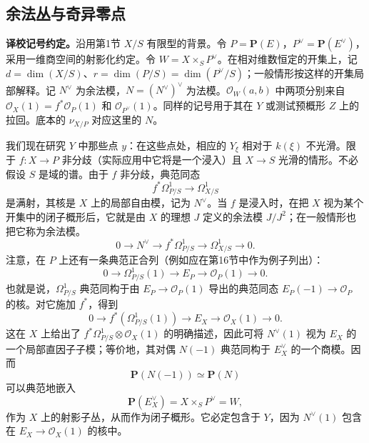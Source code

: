 
\subsection*{余法丛与奇异零点}
\noindent\textbf{译校记号约定。}沿用第1节 $X/S$ 有限型的背景。令 $P=\mathbf P(E)$，$P^\vee=\mathbf P(E^\vee)$，采用一维商空间的射影化约定。令 $W=X\times_S P^\vee$。在相对维数恒定的开集上，记 $d=\dim(X/S)$、$r=\dim(P/S)=\dim(P^\vee/S)$；一般情形按这样的开集局部解释。记 $N^\vee$ 为余法模，$N=(N^\vee)^\vee$ 为法模。$\mathcal O_W(a,b)$ 中两项分别来自 $\mathcal O_X(1)=f^*\mathcal O_P(1)$ 和 $\mathcal O_{P^\vee}(1)$。同样的记号用于其在 $Y$ 或测试预概形 $Z$ 上的拉回。底本的 $\nu_{X/P}$ 对应这里的 $N$。


我们现在研究 $Y$ 中那些点 $y$：在这些点处，相应的 $Y_\xi$ 相对于 $k(\xi)$ 不光滑。限于 $f:X\to P$ 非分歧（实际应用中它将是一个浸入）且 $X\to S$ 光滑的情形。不必假设 $S$ 是域的谱。由于 $f$ 非分歧，典范同态
\[
f^*\Omega^1_{P/S}\longrightarrow\Omega^1_{X/S}
\]
是满射，其核是 $X$ 上的局部自由模，记为 $N^\vee$。当 $f$ 是浸入时，在把 $X$ 视为某个开集中的闭子概形后，它就是由 $X$ 的理想 $J$ 定义的余法模 $J/J^2$；在一般情形也把它称为余法模。
\begin{equation}
0\longrightarrow N^\vee\longrightarrow f^*\Omega^1_{P/S}
\longrightarrow\Omega^1_{X/S}\longrightarrow0.\tag{a}
\end{equation}
注意，在 $P$ 上还有一条典范正合列（例如应在第16节中作为例子列出）：
\begin{equation}
0\longrightarrow\Omega^1_{P/S}(1)\longrightarrow E_P
\longrightarrow\mathcal O_P(1)\longrightarrow0.\tag{b}
\end{equation}
也就是说，$\Omega^1_{P/S}$ 典范同构于由 $E_P\to\mathcal O_P(1)$ 导出的典范同态 $E_P(-1)\to\mathcal O_P$ 的核。对它施加 $f^*$，得到
\begin{equation}
0\longrightarrow f^*(\Omega^1_{P/S}(1))\longrightarrow E_X
\longrightarrow\mathcal O_X(1)\longrightarrow0.\tag{$b_1$}
\end{equation}
这在 $X$ 上给出了 $f^*\Omega^1_{P/S}\otimes\mathcal O_X(1)$ 的明确描述，因此可将 $N^\vee(1)$ 视为 $E_X$ 的一个局部直因子子模；等价地，其对偶 $N(-1)$ 典范同构于 $E_X^\vee$ 的一个商模。因而
\[
\mathbf P(N(-1))\simeq\mathbf P(N)
\]
可以典范地嵌入
\[
\mathbf P(E_X^\vee)=X\times_S P^\vee=W,
\]
作为 $X$ 上的射影子丛，从而作为闭子概形。它必定包含于 $Y$，因为 $N^\vee(1)$ 包含在 $E_X\to\mathcal O_X(1)$ 的核中。

